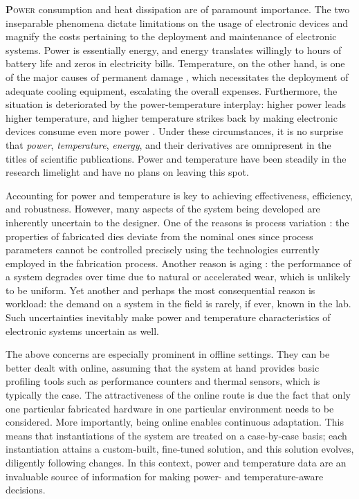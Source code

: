 \lettrine[findent=0.4em, nindent=0em]{\textbf{P}}{ower} consumption and heat
dissipation are of paramount importance. The two inseparable phenomena dictate
limitations on the usage of electronic devices and magnify the costs pertaining
to the deployment and maintenance of electronic systems. Power is essentially
energy, and energy translates willingly to hours of battery life and zeros in
electricity bills. Temperature, on the other hand, is one of the major causes of
permanent damage \cite{jedec}, which necessitates the deployment of adequate
cooling equipment, escalating the overall expenses. Furthermore, the situation
is deteriorated by the power-temperature interplay: higher power leads higher
temperature, and higher temperature strikes back by making electronic devices
consume even more power \cite{liu2007}. Under these circumstances, it is no
surprise that \emph{power}, \emph{temperature}, \emph{energy}, and their
derivatives are omnipresent in the titles of scientific publications. Power and
temperature have been steadily in the research limelight and have no plans on
leaving this spot.

Accounting for power and temperature is key to achieving effectiveness,
efficiency, and robustness. However, many aspects of the system being developed
are inherently uncertain to the designer. One of the reasons is process
variation \cite{chandrakasan2000}: the properties of fabricated dies deviate
from the nominal ones since process parameters cannot be controlled precisely
using the technologies currently employed in the fabrication process. Another
reason is aging \cite{coskun2006}: the performance of a system degrades over
time due to natural or accelerated wear, which is unlikely to be uniform. Yet
another and perhaps the most consequential reason is workload: the demand on a
system in the field is rarely, if ever, known in the lab. Such uncertainties
inevitably make power and temperature characteristics of electronic systems
uncertain as well.

The above concerns are especially prominent in offline settings. They can be
better dealt with online, assuming that the system at hand provides basic
profiling tools such as performance counters and thermal sensors, which is
typically the case. The attractiveness of the online route is due the fact that
only one particular fabricated hardware in one particular environment needs to
be considered. More importantly, being online enables continuous adaptation.
This means that instantiations of the system are treated on a case-by-case
basis; each instantiation attains a custom-built, fine-tuned solution, and this
solution evolves, diligently following changes. In this context, power and
temperature data are an invaluable source of information for making power- and
temperature-aware decisions.

